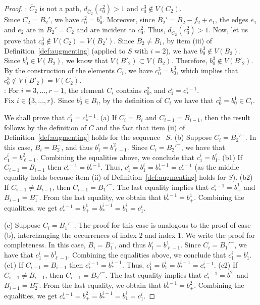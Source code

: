 \documentclass[12pt,reqno,a4paper]{amsart}
\begin{document}
\begin{proof}

: \(\bar C_2\) is not a path, \(d_{\bar
  C_2}(c^2_0) > 1\) and $c^3_0 \notin V(C_2)$. \\

Since $C_2=B_2'$, we have $c^2_0=b^1_0$. Moreover, since 
$\bar B_2'= \bar B_2 - f_2 +e_1$, the edges $e_1$ and $e_2$ are in
$\bar B_2'=C_2$ and are incident to $c_0^2$. Thus, \(d_{\bar C_2}(c^2_0) > 1\).
Now, let us prove
that $c^3_0\notin V(C_2)=V(B_2')$.  Since \(B_2 \neq B_1\),
by item (iii) of Definition~\ref{def:augmenting} (applied to \(S\)
with \(i=2\)),
we have \(b_0^3\notin V(B_2)\).
Since \(b_0^1\in V(B_2)\),
we know that \(V(B'_2)\subset V(B_2)\).
Therefore, \(b_0^3\notin V(B'_2)\).
By the construction of the elements $C_i$, we have \(c_0^3 = b_0^3\),
which implies that \(c_0^3\notin V(B'_2)=V(C_2)\).\\ 


: For $i=3,\ldots, r-1$, 
the element \(C_i\) contains \(c_0^2\), and \(c_1^{i} =c^{i-1}_{*}\). \\

Fix \(i\in \{3, \ldots, r\}\). Since $b^1_0\in B_i$, by the definition of $C_i$ 
we have that $c_0^2 = b^1_0\in C_i$.

We shall prove that \(c_1^{i} =c^{i-1}_{*}\). 
(a) If $C_i = B_i$ and $C_{i-1} = B_{i-1}$, then the result follows
by the definition of $C$ and the fact that item (ii) of
Definition~\ref{def:augmenting} holds for the sequence~ $S$.
%
(b) Suppose $C_i=B_2'^-$.  In this case, $B_i = B_2^-$, and thus
$b_1^i = b_{\ell -1}^2$.  Since $C_i=B_2'^-$, we have that
$c_1^i = b_{\ell-1}^2$.  Combining the equalities
above, we conclude that $c_1^i = b_1^i$.  (b1) If $C_{i-1} = B_{i-1}$
then $c_*^{i-1} = b_*^{i-1}$.  Thus,
$c_1^i =b_1^i = b_*^{i-1} = c_*^{i-1}$ (as the middle equality holds
because item (ii) of Definition~\ref{def:augmenting} holds for $S$).
(b2) If $C_{i-1} \neq B_{i-1}$, then $C_{i-1} = B_1'^-$. The last
equality implies that $c_*^{i-1} = b_{+}^1$ and $B_{i-1} = B_1^-$.
From the last equality, we obtain that $b_*^{i-1} = b_{+}^1$.
Combining the equalities, we get
$c_*^{i-1}= b_{+}^1 =b_*^{i-1} = b_1^i = c_1 ^i$.
 
(c) Suppose $C_i=B_1'^-$. The proof for this case is analogous to the
proof of case (b), interchanging the occurrences of index $2$ and index
$1$. We write the proof for completeness. In this case, $B_i = B_1^-$, and thus
$b_1^i = b_{\ell -1}^1$. Since $C_i=B_1'^-$, we have that
$c_1^i = b_{\ell-1}^1$.  Combining the equalities
above, we conclude that $c_1^i = b_1^i$. (c1) If $C_{i-1} = B_{i-1}$
then $c_*^{i-1} = b_*^{i-1}$.  Thus,
$c_1^i =b_1^i = b_*^{i-1} = c_*^{i-1}$. (c2) If $C_{i-1} \neq B_{i-1}$, then $C_{i-1} = B_2'^-$. The last
equality implies that $c_*^{i-1} = b_{+}^2$ and $B_{i-1} = B_2^-$.
From the last equality, we obtain that $b_*^{i-1} = b_{+}^2$.
Combining the equalities, we get
$c_*^{i-1}= b_{+}^2 =b_*^{i-1} = b_1^i = c_1 ^i$.


\end{proof}
\end{document}

